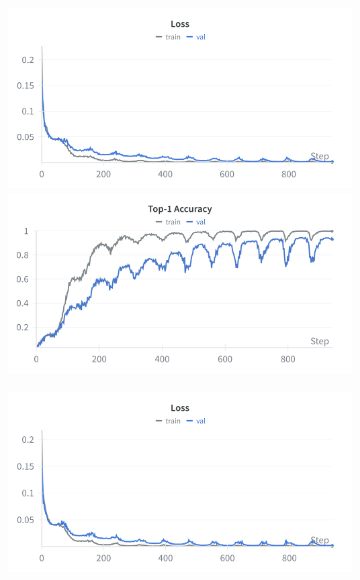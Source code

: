 \documentclass[a4paper,11pt,twoside]{report}
\theoremstyle{definition}
\begin{document}
\begin{figure}[h!]
\centering

\begin{subfigure}{\linewidth}
    \centering
    \begin{minipage}{0.49\linewidth}
        \centering
        \includegraphics[width=\linewidth]{img_results/loss_alphanum.png}
    \end{minipage}
    \hfill
    \begin{minipage}{0.49\linewidth}
        \centering
        \includegraphics[width=\linewidth]{img_results/acc_alphanum.png}
    \end{minipage}
    \caption{}
\end{subfigure}
\vspace{0.5em}
\begin{subfigure}{\linewidth}
    \centering
    \begin{minipage}{0.49\linewidth}
        \centering
        \includegraphics[width=\linewidth]{img_results/loss_all.png}

\end{minipage}
\end{subfigure}
\end{figure}
\end{document}
